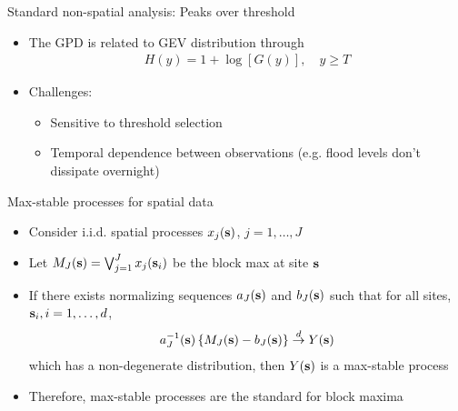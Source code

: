 \documentclass{beamer}
\begin{document}
\begin{frame}{Standard non-spatial analysis: Peaks over threshold}
  \begin{itemize} \setlength{\itemsep}{1em}
    \item The GPD is related to GEV distribution through
    \begin{align*}
      H(y) = 1 + \log[G(y)], \quad y \ge T
    \end{align*}
    \item Challenges:
    \begin{itemize}
      \item Sensitive to threshold selection
      \item Temporal dependence between observations (e.g. flood levels don't dissipate overnight)
    \end{itemize}
  \end{itemize}
\end{frame}


\begin{frame}{Max-stable processes for spatial data}
  \begin{itemize} \setlength{\itemsep}{1em}
    \item Consider i.i.d. spatial processes $x_j(\mbox{\bf s})$, $j = 1, \ldots, J$
    \item Let $M_J(\mbox{\bf s}) = \bigvee_{j=1}^J x_j(\mbox{\bf s}_i)$ be the block max at site $\mbox{\bf s}$
    \item If there exists normalizing sequences $a_J(\mbox{\bf s})$ and $b_J(\mbox{\bf s})$ such that for all sites, $\mbox{\bf s}_i, i = 1, \ldots, d$,
    \begin{align*}
      a_J^{-1}(\mbox{\bf s}) \left\{ M_J(\mbox{\bf s}) - b_J(\mbox{\bf s}) \right\} \stackrel{d}{\rightarrow} Y(\mbox{\bf s})
    \end{align*}
    which has a non-degenerate distribution, then $Y(\mbox{\bf s})$ is a max-stable process
    \item Therefore, max-stable processes are the standard for block maxima
  \end{itemize}
\end{frame}
\end{document}
